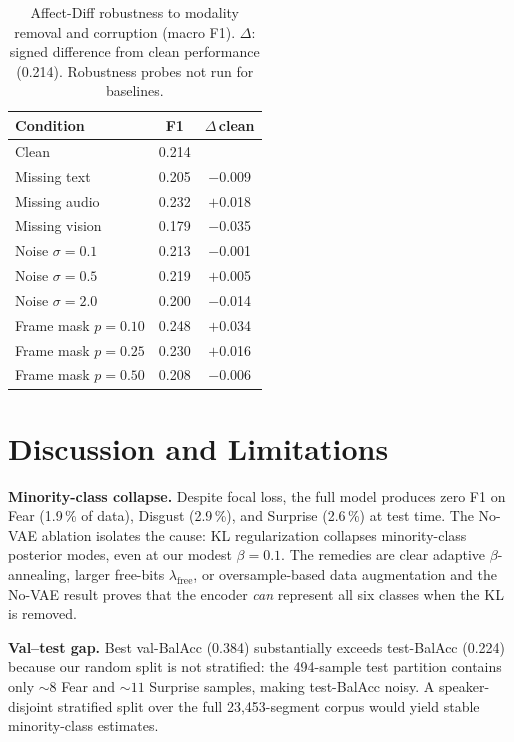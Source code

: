 \documentclass[conference]{IEEEtran}
\begin{document}
\begin{table}[htbp]
\caption{Affect-Diff robustness to modality removal and corruption (macro F1).
$\Delta$: signed difference from clean performance (0.214).
Robustness probes not run for baselines.}
\label{tab:robustness}
\begin{center}
\setlength{\tabcolsep}{5pt}
\begin{tabular}{@{}lcc@{}}
\toprule
\textbf{Condition} & \textbf{F1} & \textbf{$\Delta$\,clean} \\
\midrule
Clean                     & 0.214 &        \\
\midrule
Missing text               & 0.205 & $-$0.009 \\
Missing audio              & 0.232 & $+$0.018 \\
Missing vision             & 0.179 & $-$0.035 \\
\midrule
Noise $\sigma=0.1$         & 0.213 & $-$0.001 \\
Noise $\sigma=0.5$         & 0.219 & $+$0.005 \\
Noise $\sigma=2.0$         & 0.200 & $-$0.014 \\
\midrule
Frame mask $p=0.10$        & 0.248 & $+$0.034 \\
Frame mask $p=0.25$        & 0.230 & $+$0.016 \\
Frame mask $p=0.50$        & 0.208 & $-$0.006 \\
\bottomrule
\end{tabular}
\end{center}
\end{table}

\section{Discussion and Limitations}

\textbf{Minority-class collapse.}  Despite focal loss, the full model produces
zero F1 on Fear (1.9\,\% of data), Disgust (2.9\,\%), and Surprise (2.6\,\%)
at test time.  The No-VAE ablation isolates the cause: KL regularization
collapses minority-class posterior modes, even at our modest $\beta=0.1$.
The remedies are clear adaptive $\beta$-annealing, larger free-bits
$\lambda_\mathrm{free}$, or oversample-based data augmentation and
the No-VAE result proves that the encoder \emph{can} represent all six classes
when the KL is removed.

\textbf{Val--test gap.}  Best val-BalAcc (0.384) substantially exceeds
test-BalAcc (0.224) because our random split is not stratified: the 494-sample
test partition contains only ${\sim}8$ Fear and ${\sim}11$ Surprise samples,
making test-BalAcc noisy.  A speaker-disjoint stratified split over the full
23{,}453-segment corpus would yield stable minority-class estimates.
\end{document}
